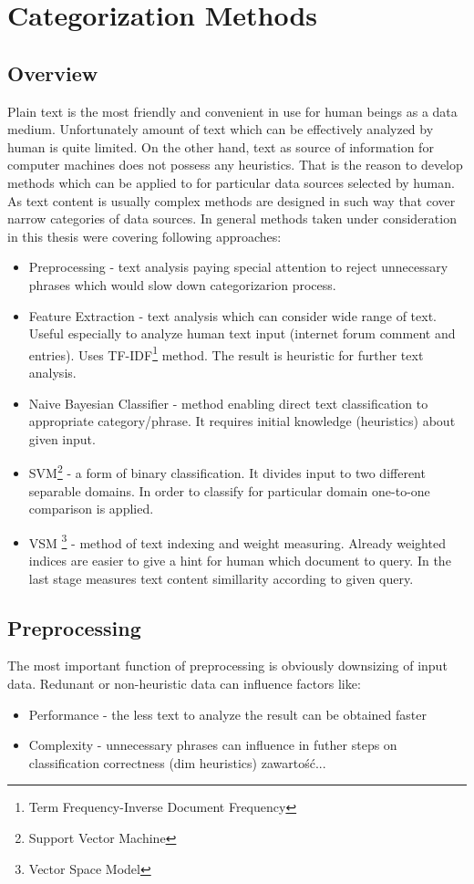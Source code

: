 \chapter{Categorization Methods}
\section{Overview}
Plain text is the most friendly and convenient in use for human beings as a data medium. Unfortunately amount of text which can be effectively analyzed by human is quite limited. On the other hand, text as source of information for computer machines does not possess any heuristics. That is the reason to develop methods which can be applied to for particular data sources selected by human. As text content is usually complex methods are designed in such way that cover narrow categories of data sources. In general methods taken under consideration in this thesis were covering following approaches:
\begin{itemize}
	\item Preprocessing - text analysis paying special attention to reject unnecessary phrases which would slow down categorizarion process.
	\item Feature Extraction - text analysis which can consider wide range of text. Useful especially to analyze human text input (internet forum comment and entries). Uses TF-IDF\footnote{Term Frequency-Inverse Document Frequency} method. The result is heuristic for further text analysis.
	\item Naive Bayesian Classifier - method enabling direct text classification to appropriate category/phrase. It requires initial knowledge (heuristics) about given input.
	\item SVM\footnote{Support Vector Machine} - a form of binary classification. It divides input to two different separable domains. In order to classify for particular domain one-to-one comparison is applied.
	\item VSM \footnote{Vector Space Model} - method of text indexing and weight measuring. Already weighted indices are easier to give a hint for human which document to query. In the last stage measures text content simillarity according to given query.
	       
\end{itemize}

\section{Preprocessing}
The most important function of preprocessing is obviously downsizing of input data. Redunant or non-heuristic data can influence factors like:
\begin{itemize}
	\item Performance - the less text to analyze the result can be obtained faster
	\item Complexity - unnecessary phrases can influence in futher steps on classification correctness (dim heuristics)
	zawartość...
\end{itemize}

